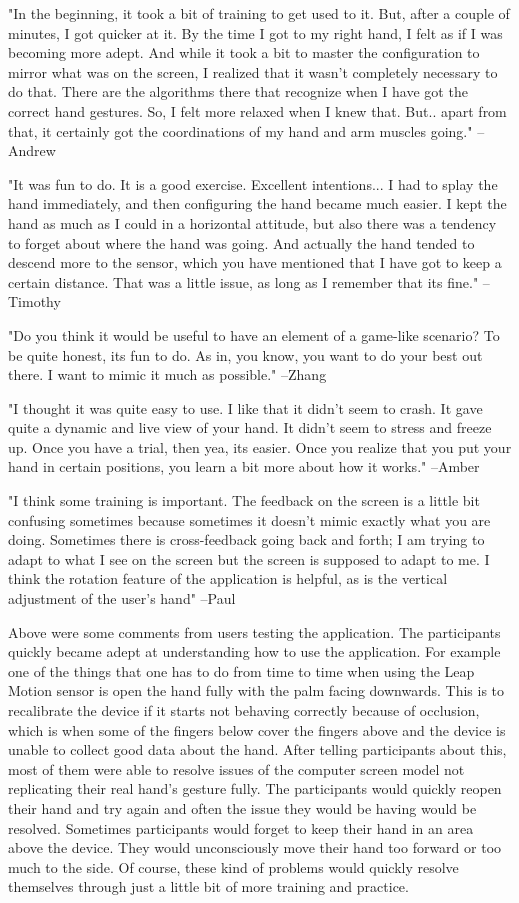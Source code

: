 "In the beginning, it took a bit of training to get used to it. But, after a couple of minutes, I got quicker at it. By the time I got to my right hand, I felt as if I was becoming more adept. And while it took a bit to master the configuration to mirror what was on the screen, I realized that it wasn't completely necessary to do that. There are the algorithms there that recognize when I have got the correct hand gestures. So, I felt more relaxed when I knew that. But.. apart from that, it certainly got the coordinations of my hand and arm muscles going." --Andrew

"It was fun to do. It is a good exercise. Excellent intentions... I had to splay the hand immediately, and then configuring the hand became much easier. I kept the hand as much as I could in a horizontal attitude, but also there was a tendency to forget about where the hand was going. And actually the hand tended to descend more to the sensor, which you have mentioned that I have got to keep a certain distance. That was a little issue, as long as I remember that its fine." --Timothy

"Do you think it would be useful to have an element of a game-like scenario? To be quite honest, its fun to do. As in, you know, you want to do your best out there. I want to mimic it much as possible." --Zhang

"I thought it was quite easy to use. I like that it didn't seem to crash. It gave quite a dynamic and live view of your hand. It didn't seem to stress and freeze up. Once you have a trial, then yea, its easier. Once you realize that you put your hand in certain positions, you learn a bit more about how it works." --Amber

"I think some training is important. The feedback on the screen is a little bit confusing sometimes because sometimes it doesn't mimic exactly what you are doing. Sometimes there is cross-feedback going back and forth; I am trying to adapt to what I see on the screen but the screen is supposed to adapt to me. I think the rotation feature of the application is helpful, as is the vertical adjustment of the user's hand" --Paul

Above were some comments from users testing the application. The participants quickly became adept at understanding how to use the application. For example one of the things that one has to do from time to time when using the Leap Motion sensor is open the hand fully with the palm facing downwards. This is to recalibrate the device if it starts not behaving correctly because of occlusion, which is when some of the fingers below cover the fingers above and the device is unable to collect good data about the hand. After telling participants about this, most of them were able to resolve issues of the computer screen model not replicating their real hand's gesture fully. The participants would quickly reopen their hand and try again and often the issue they would be having would be resolved. Sometimes participants would forget to keep their hand in an area above the device. They would unconsciously move their hand too forward or too much to the side. Of course, these kind of problems would quickly resolve themselves through just a little bit of more training and practice. 


